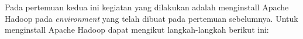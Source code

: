 \documentclass[a4paper]{tufte-handout}
\begin{document}
\begin{comment}
\vspace*{-.5cm}
\hrulefill


\clearpage
\newday{\#6 - 1 Desember 2022 menggantikan 13 Oktober 2022
\footnote{Mahasiswa yang hadir:
\begin{enumerate}
\item Adinda Awaliah
\item Arya Saputra $\oplus$
\item Cut Opy Mandalisa
\item Jihan Dwi Sarah
\item M. Ikhsan
\item Muhammad Ikrammullah
\item Muhammad Munawir
\item Nadzura Kumaira
\item Nurani Harum Fardaniah
\item Rauzatinur Syah
\item Resha Russita
\item Rizki Ilhami
\item Salsabila Irmanda
\item Syarfani Akbar
\item Taravia Fauzah
\item Zulfahmi
\end{enumerate}}}
\end{comment}


Pada pertemuan kedua ini kegiatan yang dilakukan adalah menginstall Apache Hadoop pada \textit{environment} yang telah dibuat pada pertemuan sebelumnya. Untuk menginstall Apache Hadoop dapat mengikut langkah-langkah berikut ini:
\end{document}

